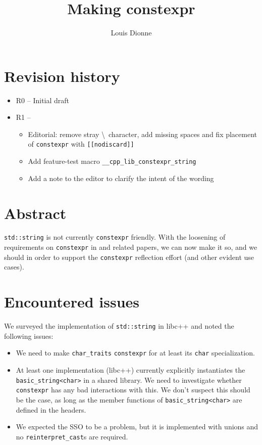 \documentclass{wg21}
\title{Making \cc{std::string} constexpr}
\author{Louis Dionne}{ldionne@apple.com}
\newcommand{\cc}[1]{\texttt{#1}}
\begin{document}
\maketitle

\section{Revision history}
\begin{itemize}
  \item R0 -- Initial draft
  \item R1 -- \begin{itemize}
              \item Editorial: remove stray \textbackslash \, character, add
                    missing spaces and fix placement of \cc{constexpr} with
                    \cc{[[nodiscard]]}
              \item Add feature-test macro \cc{__cpp_lib_constexpr_string}
              \item Add a note to the editor to clarify the intent of the wording
              \end{itemize}
\end{itemize}

\section{Abstract}
\cc{std::string} is not currently \cc{constexpr} friendly. With the loosening
of requirements on \cc{constexpr} in \cite{P0784R1} and related papers, we
can now make it so, and we should in order to support the \cc{constexpr}
reflection effort (and other evident use cases).


\section{Encountered issues}
We surveyed the implementation of \cc{std::string} in libc++ and noted the
following issues:
\begin{itemize}
  \item We need to make \cc{char_traits} \cc{constexpr} for at least its
        \cc{char} specialization.
  \item At least one implementation (libc++) currently explicitly instantiates
        the \cc{basic_string<char>} in a shared library. We need to investigate
        whether \cc{constexpr} has any bad interactions with this. We don't
        suspect this should be the case, as long as the member functions of
        \cc{basic_string<char>} are defined in the headers.
  \item We expected the SSO to be a problem, but it is implemented with unions
        and no \cc{reinterpret_cast}s are required.
\end{itemize}
\end{document}
